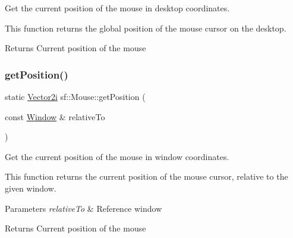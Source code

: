 Get the current position of the mouse in desktop coordinates. 

This function returns the global position of the mouse cursor on the desktop.

\begin{DoxyReturn}{Returns}
Current position of the mouse \begin{DoxyVerb}\end{DoxyVerb}
 
\end{DoxyReturn}
\mbox{\label{classsf_1_1_mouse_a93b4d2ebef728e77a0ec9d83c1e0b0c8}} 
\subsubsection{\texorpdfstring{getPosition()}{getPosition()}\hspace{0.1cm}{\footnotesize\ttfamily [2/2]}}
{\footnotesize\ttfamily static \mbox{\hyperlink{classsf_1_1_vector2}{Vector2i}} sf\+::\+Mouse\+::get\+Position (\begin{DoxyParamCaption}\item[{const \mbox{\hyperlink{classsf_1_1_window}{Window}} \&}]{relative\+To }\end{DoxyParamCaption})\hspace{0.3cm}{\ttfamily [static]}}



Get the current position of the mouse in window coordinates. 

This function returns the current position of the mouse cursor, relative to the given window.


\begin{DoxyParams}{Parameters}
{\em relative\+To} & Reference window\\
\hline
\end{DoxyParams}
\begin{DoxyReturn}{Returns}
Current position of the mouse \begin{DoxyVerb}\end{DoxyVerb}
 
\end{DoxyReturn}
\mbox{\label{classsf_1_1_mouse_ab647159eb88e369a0332a9c5a7ba6687}} 
